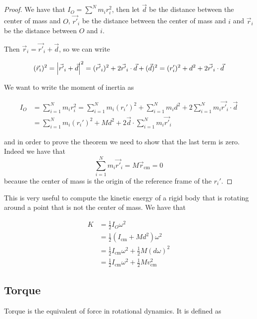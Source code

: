 \documentclass[12pt]{extarticle}
\begin{document}
\begin{proof}
    We have that $I_O = \sum^N m_i r_i^2$, then let $\vec{d}$ be the distance between the center of mass and $O$, $\vec{r'}_i$ be the distance between the center of mass and $i$ and $\vec{r}_i$ be the distance between $O$ and $i$.

    Then $\vec{r}_i = \vec{r'}_i + \vec{d}$, so we can write

    $$
        (\vec{r}_i)^2 = \abs{\vec{r'}_i + \vec{d}}^2 = (\vec{r'}_i)^2 + 2 \vec{r'}_i \cdot \vec{d} + (\vec{d})^2 = (r_i')^2 + d^2 + 2 \vec{r'}_i \cdot \vec{d}
    $$

    We want to write the moment of inertia as

    \begin{align}
        I_O & = \sum^N_{i = 1} m_i r_i^2 = \sum^N_{i = 1} m_i (r_i')^2 + \sum^N_{i = 1} m_i d^2 + 2 \sum^N_{i = 1} m_i \vec{r'}_i \cdot \vec{d} \\
            & = \sum^N_{i = 1} m_i (r_i')^2 + M d^2 + 2 \vec{d} \cdot \sum^N_{i = 1} m_i \vec{r'}_i
    \end{align}

    and in order to prove the theorem we need to show that the last term is zero.
    Indeed we have that
    $$
        \sum^N_{i = 1} m_i \vec{r'}_i = M \vec{r}_{\text{cm}} = 0
    $$
    because the center of mass is the origin of the reference frame of the $r_i'$.
\end{proof}

This is very useful to compute the kinetic energy of a rigid body that is rotating around a point that is not the center of mass.
We have that

\begin{align}
    K & = \frac{1}{2} I_O \omega^2                                           \\
      & = \frac{1}{2} (I_{\text{cm}} + M d^2) \omega^2                       \\
      & = \frac{1}{2} I_{\text{cm}} \omega^2 + \frac{1}{2} M (d \omega)^2    \\
      & = \frac{1}{2} I_{\text{cm}} \omega^2 + \frac{1}{2} M v_{\text{cm}}^2
\end{align}

\subsection{Torque}

Torque is the equivalent of force in rotational dynamics. It is defined as
\end{document}
